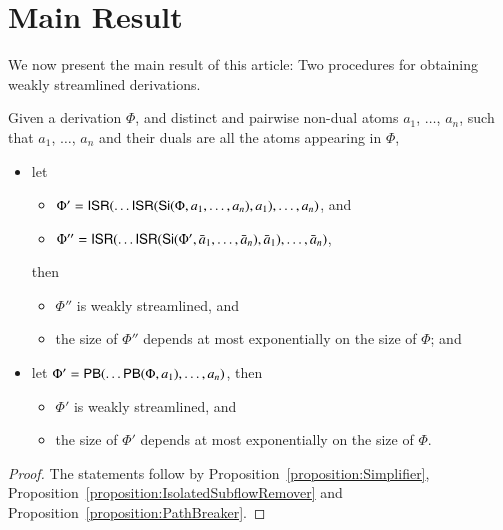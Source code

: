 \section{Main Result}\label{section:MainResult}


We now present the main result of this article: Two procedures for obtaining weakly streamlined derivations.

\begin{theorem}\label{theorem:WeakStreamlining}
Given a derivation $\Phi$, and distinct and pairwise non-dual atoms $a_1$, $\dots$, $a_n$, such that $a_1$, $\dots$, $a_n$ and their duals are all the atoms appearing in $\Phi$,
\begin{itemize}
\item let
\begin{itemize}
\item $\Phi'=\mathsf{ISR}(\dots\mathsf{ISR}(\mathsf{Si}(\Phi,a_1,\dots,a_n),a_1),\dots,a_n)$, and
\item $\Phi''=\mathsf{ISR}(\dots\mathsf{ISR}(\mathsf{Si}(\Phi',\bar a_1,\dots,\bar a_n),\bar a_1),\dots,\bar a_n)$,
\end{itemize}
then
\begin{itemize}
\item $\Phi''$ is weakly streamlined, and
\item the size of $\Phi''$ depends at most exponentially on the size of\/ $\Phi$; and
\end{itemize}
\item let\/ $\Phi'=\mathsf{PB}(\dots\mathsf{PB}(\Phi,a_1),\dots,a_n)$, then
\begin{itemize}
\item $\Phi'$ is weakly streamlined, and
\item the size of\/ $\Phi'$ depends at most exponentially on the size of\/ $\Phi$.
\end{itemize}
\end{itemize}
\end{theorem}

\begin{proof}
The statements follow by Proposition~\vref{proposition:Simplifier}, Proposition~\vref{proposition:IsolatedSubflowRemover} and Proposition~\vref{proposition:PathBreaker}.
\end{proof}

